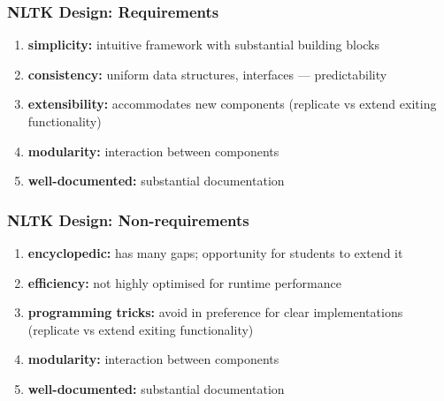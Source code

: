 \documentclass{beamer}             %
\begin{document}
\begin{frame}
  \frametitle{NLTK Design: Requirements}
  \begin{enumerate}
    \item \textbf{simplicity:} intuitive framework with substantial building blocks
    \item \textbf{consistency:} uniform data structures, interfaces --- predictability
    \item \textbf{extensibility:} accommodates new components
      (replicate vs extend exiting functionality)
    \item \textbf{modularity:} interaction between components
    \item \textbf{well-documented:} substantial documentation
  \end{enumerate}
\end{frame}

\begin{frame}
  \frametitle{NLTK Design: Non-requirements}
  \begin{enumerate}
    \item \textbf{encyclopedic:} has many gaps; opportunity for students to extend it
    \item \textbf{efficiency:} not highly optimised for runtime performance
    \item \textbf{programming tricks:} avoid in preference for clear implementations
      (replicate vs extend exiting functionality)
    \item \textbf{modularity:} interaction between components
    \item \textbf{well-documented:} substantial documentation
  \end{enumerate}
\end{frame}
\end{document}
